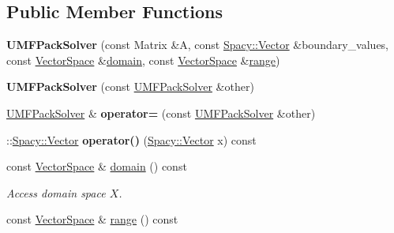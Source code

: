 \subsection*{Public Member Functions}
\begin{DoxyCompactItemize}
\item 
\hypertarget{classSpacy_1_1dealII_1_1UMFPackSolver_acc2837eda57e4331e3b18b964fb0a901}{{\bfseries U\-M\-F\-Pack\-Solver} (const Matrix \&A, const \hyperlink{classSpacy_1_1Vector}{Spacy\-::\-Vector} \&boundary\-\_\-values, const \hyperlink{classSpacy_1_1VectorSpace}{Vector\-Space} \&\hyperlink{classSpacy_1_1OperatorBase_a2588f9b3e0188820c4c494e63293dc6f}{domain}, const \hyperlink{classSpacy_1_1VectorSpace}{Vector\-Space} \&\hyperlink{classSpacy_1_1OperatorBase_ab19d3b7a6f290b1079248f1e567e53d6}{range})}\label{classSpacy_1_1dealII_1_1UMFPackSolver_acc2837eda57e4331e3b18b964fb0a901}

\item 
\hypertarget{classSpacy_1_1dealII_1_1UMFPackSolver_adb7083c76e86de9bf4b7da93ce4b453b}{{\bfseries U\-M\-F\-Pack\-Solver} (const \hyperlink{classSpacy_1_1dealII_1_1UMFPackSolver}{U\-M\-F\-Pack\-Solver} \&other)}\label{classSpacy_1_1dealII_1_1UMFPackSolver_adb7083c76e86de9bf4b7da93ce4b453b}

\item 
\hypertarget{classSpacy_1_1dealII_1_1UMFPackSolver_a4f7e3651b0990072a64b2c4d42ae508b}{\hyperlink{classSpacy_1_1dealII_1_1UMFPackSolver}{U\-M\-F\-Pack\-Solver} \& {\bfseries operator=} (const \hyperlink{classSpacy_1_1dealII_1_1UMFPackSolver}{U\-M\-F\-Pack\-Solver} \&other)}\label{classSpacy_1_1dealII_1_1UMFPackSolver_a4f7e3651b0990072a64b2c4d42ae508b}

\item 
\hypertarget{classSpacy_1_1dealII_1_1UMFPackSolver_add34a7cd66b176f90da2875913ce12fd}{\-::\hyperlink{classSpacy_1_1Vector}{Spacy\-::\-Vector} {\bfseries operator()} (\hyperlink{classSpacy_1_1Vector}{Spacy\-::\-Vector} x) const }\label{classSpacy_1_1dealII_1_1UMFPackSolver_add34a7cd66b176f90da2875913ce12fd}

\item 
\hypertarget{classSpacy_1_1OperatorBase_a2588f9b3e0188820c4c494e63293dc6f}{const \hyperlink{classSpacy_1_1VectorSpace}{Vector\-Space} \& \hyperlink{classSpacy_1_1OperatorBase_a2588f9b3e0188820c4c494e63293dc6f}{domain} () const }\label{classSpacy_1_1OperatorBase_a2588f9b3e0188820c4c494e63293dc6f}

\begin{DoxyCompactList}\small\item\em Access domain space $X$. \end{DoxyCompactList}\item 
\hypertarget{classSpacy_1_1OperatorBase_ab19d3b7a6f290b1079248f1e567e53d6}{const \hyperlink{classSpacy_1_1VectorSpace}{Vector\-Space} \& \hyperlink{classSpacy_1_1OperatorBase_ab19d3b7a6f290b1079248f1e567e53d6}{range} () const }\label{classSpacy_1_1OperatorBase_ab19d3b7a6f290b1079248f1e567e53d6}


\end{DoxyCompactItemize}
